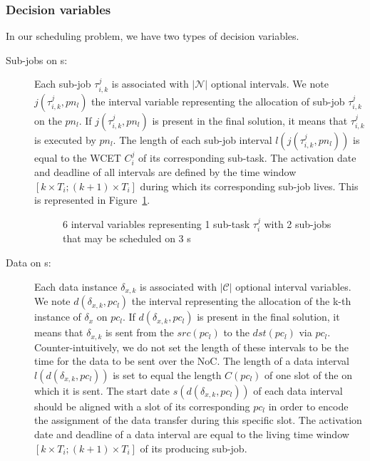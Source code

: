 \documentclass[main.tex]{subfiles}
\begin{document}
\subsubsection{Decision variables}
\label{sssec_validation_decisionVariables}
In our scheduling problem, we have two types of decision variables. 
\begin{description}
    \item[Sub-jobs on \PN{}s:] Each sub-job $\tau_{i,k}^j$ is associated with $|\mathcal{N}|$ optional intervals. We note $j(\tau_{i,k}^j , pn_l)$ the interval variable representing the allocation of sub-job $\tau_{i,k}^j$ on the \PN{} $pn_l$. If $j(\tau_{i,k}^j , pn_l)$ is present in the final solution, it means that $\tau_{i,k}^j$ is executed by \PN{} $pn_l$. The length of each sub-job interval $l(j(\tau_{i,k}^j , pn_l))$ is equal to the WCET $C_i^j$ of its corresponding sub-task. The activation date and deadline of all intervals are defined by the time window $[k \times T_i ; (k+1) \times T_i ]$ during which its corresponding sub-job lives. This is represented in Figure~\ref{fig_validation_decVarJobs}.

        \begin{figure}
            \centering
            \scalebox{0.9}{}
            \caption{6 interval variables representing 1 sub-task $\tau_i^j$ with 2 sub-jobs that may be scheduled on 3 \PN{}s  }
            \label{fig_validation_decVarJobs}
        \end{figure}

    \item[Data on \PC{}s:] Each data instance $\delta_{x,k}$ is associated with $|\mathcal{C}|$ optional interval variables. We note $d(\delta_{x,k} , pc_l)$ the interval representing the allocation of the k-th instance of $\delta_x$ on \PC{} $pc_l$. If $d(\delta_{x,k} , pc_l)$ is present in the final solution, it means that $\delta_{x,k}$ is sent from the \PN{} $src(pc_l)$ to the \PN{} $dst(pc_l)$ via $pc_l$. Counter-intuitively, we do not set the length of these intervals to be the time for the data to be sent over the NoC. The length of a data interval $l(d(\delta_{x,k} , pc_l))$ is set to equal the length $C(pc_l)$ of one slot of the \PC{} on which it is sent. The start date $s(d(\delta_{x,k} , pc_l))$ of each data interval should be aligned with a slot of its corresponding \PC{} $pc_l$ in order to encode the assignment of the data transfer during this specific slot. The activation date and deadline of a data interval are equal to the living time window $[k \times T_i ; (k+1) \times T_i ]$ of its producing sub-job.
\end{description}
\end{document}
